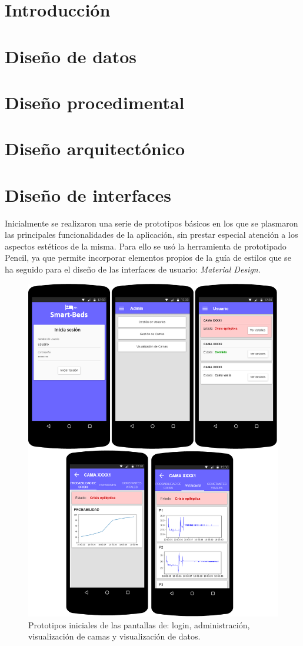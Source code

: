 
\section{Introducción}

\section{Diseño de datos}

\section{Diseño procedimental}

\section{Diseño arquitectónico}

\section{Diseño de interfaces}

Inicialmente se realizaron una serie de prototipos básicos en los que se plasmaron las principales funcionalidades de la aplicación, sin prestar especial atención a los aspectos estéticos de la misma. Para ello se usó la herramienta de prototipado Pencil, ya que permite incorporar elementos propios de la guía de estilos que se ha seguido para el diseño de las interfaces de usuario: \textit{Material Design}. 

\begin{figure}
	\centering
	\includegraphics[width=1\textwidth]{../img/prototipos.png}
	\caption{Prototipos iniciales de las pantallas de: login, administración, visualización de camas y visualización de datos.}
	\label{fig:prototipos}
\end{figure}
